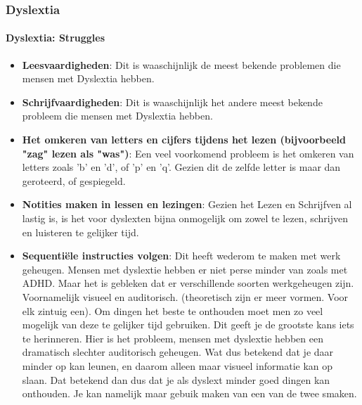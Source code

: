 \documentclass{article}
\begin{document}
            \subsubsection{Dyslextia}
                
                \bigskip\noindent\paragraph{Dyslextia: Struggles}

                    \begin{itemize}
                        \item \textbf{Leesvaardigheden}\cite{dyslextia-struggles-and-superpowers}:
                            Dit is waaschijnlijk de meest bekende problemen die mensen met Dyslextia hebben. 
                        \item \textbf{Schrijfvaardigheden}:
                            Dit is waaschijnlijk het andere meest bekende probleem die mensen met Dyslextia hebben.
                        \item \textbf{Het omkeren van letters en cijfers tijdens het lezen (bijvoorbeeld "zag" lezen als "was")}\cite{dyslextia-struggles-and-superpowers}:
                            Een veel voorkomend probleem is het omkeren van letters zoals 'b' en 'd', of 'p' en 'q'. Gezien dit de zelfde letter is maar dan geroteerd, of gespiegeld.
                        \item \textbf{Notities maken in lessen en lezingen}\cite{dyslextia-struggles-and-superpowers}:
                            Gezien het Lezen en Schrijfven al lastig is, is het voor dyslexten bijna onmogelijk om zowel te lezen, schrijven en luisteren te gelijker tijd.
                        \item \textbf{Sequentiële instructies volgen}\cite{dyslextia-struggles-and-superpowers}:
                            Dit heeft wederom te maken met werk geheugen. Mensen met dyslextie hebben er niet perse minder van zoals met ADHD. Maar het is gebleken dat er verschillende soorten werkgeheugen zijn\cite{dyslextia-different-types-of-memory}. Voornamelijk visueel en auditorisch. (theoretisch zijn er meer vormen. Voor elk zintuig een). Om dingen het beste te onthouden moet men zo veel mogelijk van deze te gelijker tijd gebruiken. Dit geeft je de grootste kans iets te herinneren. Hier is het probleem, mensen met dyslextie hebben een dramatisch slechter auditorisch geheugen. Wat dus betekend dat je daar minder op kan leunen, en daarom alleen maar visueel informatie kan op slaan. Dat betekend dan dus dat je als dyslext minder goed dingen kan onthouden. Je kan namelijk maar gebuik maken van een van de twee smaken.

\end{itemize}
\end{document}
